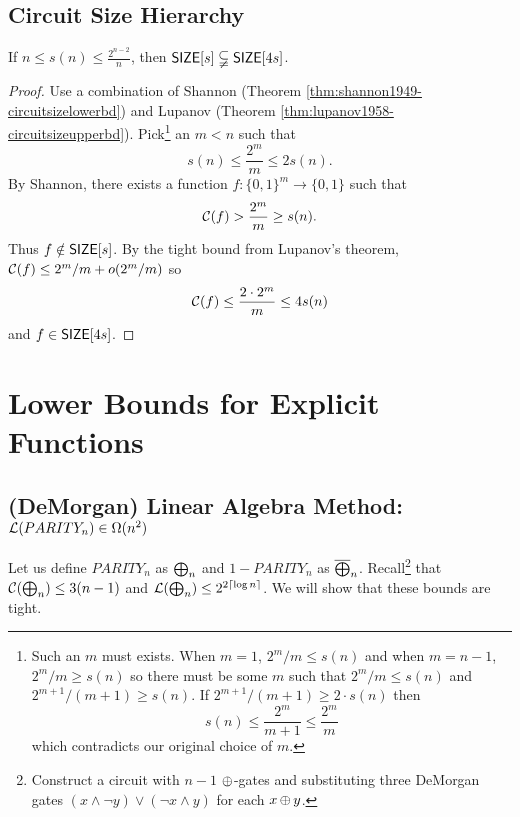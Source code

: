 \documentclass[11pt]{article}
\begin{document}
	\subsection{Circuit Size Hierarchy}
	\begin{theorem}
		\label{thm:circuitsizehierarchy}
		If $n \leq s(n) \leq \frac{2^{n-2}}{n}$, then $\mathsf{SIZE}[s] \subsetneqq \mathsf{SIZE}[4s]$.
	\end{theorem}
	\begin{proof}
		Use a combination of Shannon (Theorem \ref{thm:shannon1949-circuitsizelowerbd}) and Lupanov (Theorem \ref{thm:lupanov1958-circuitsizeupperbd}). Pick\footnote{Such an $m$ must exists. When $m = 1$, $2^{m}/m \leq s(n)$ and when $m = n-1$, $2^m/m \geq s(n)$ so there must be some $m$ such that $2^{m}/m \leq s(n)$ and $2^{m+1}/(m+1) \geq s(n)$. If $2^{m+1}/(m+1) \geq 2\cdot s(n)$ then 
			\[s(n) \leq \frac{2^{m}}{m+1} \leq \frac{2^{m}}{m}\]	
			which contradicts our original choice of $m$.} 
		an $m < n$ such that
		\[s(n) \leq \frac{2^m}{m} \leq 2s(n).\]
		By Shannon, there exists a function $f: \{0, 1\}^m \rightarrow \{0,1\}$ such that 
		\[\mathcal{C}(f) > \frac{2^m}{m} \geq s(n).\]
		Thus $f \notin \mathsf{SIZE}[s]$. By the tight bound from Lupanov's theorem, $\mathcal{C}(f) \leq 2^m/m + o(2^m/m)$ so 
		\[\mathcal{C}(f) \leq \frac{2\cdot 2^m}{m} \leq 4s(n)\]
		and $f \in \mathsf{SIZE}[4s]$. 
	\end{proof}
	
\section{Lower Bounds for Explicit Functions}
	\subsection{(DeMorgan) Linear Algebra Method: \texorpdfstring{$\mathcal{L}(PARITY_n) \in \Omega(n^2)$}{L(PARITYn) in Omega(n2)}}
	Let us define $PARITY_n$ as $\operatorname{\bigoplus}_n$ and $1 - PARITY_n$ as $\overline{\operatorname{\bigoplus}}_n$. Recall\footnote{Construct a circuit with $n-1$ $\operatorname{\oplus}$-gates and substituting three DeMorgan gates $(x \land \lnot y) \lor (\lnot x \land y)$ for each $x \operatorname{\oplus} y$.} that $\mathcal{C}(\operatorname{\bigoplus}_n) \leq 3(n-1)$ and $\mathcal{L}(\operatorname{\bigoplus}_n) \leq 2^{2\lceil\log n\rceil}$. We will show that these bounds are tight. 
	
\end{document}
